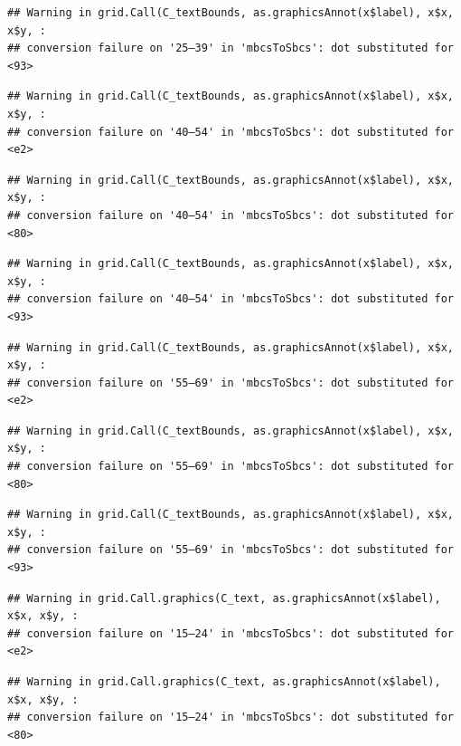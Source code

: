 \documentclass[
]{article}
\begin{document}
\begin{verbatim}
## Warning in grid.Call(C_textBounds, as.graphicsAnnot(x$label), x$x, x$y, :
## conversion failure on '25–39' in 'mbcsToSbcs': dot substituted for <93>
\end{verbatim}

\begin{verbatim}
## Warning in grid.Call(C_textBounds, as.graphicsAnnot(x$label), x$x, x$y, :
## conversion failure on '40–54' in 'mbcsToSbcs': dot substituted for <e2>
\end{verbatim}

\begin{verbatim}
## Warning in grid.Call(C_textBounds, as.graphicsAnnot(x$label), x$x, x$y, :
## conversion failure on '40–54' in 'mbcsToSbcs': dot substituted for <80>
\end{verbatim}

\begin{verbatim}
## Warning in grid.Call(C_textBounds, as.graphicsAnnot(x$label), x$x, x$y, :
## conversion failure on '40–54' in 'mbcsToSbcs': dot substituted for <93>
\end{verbatim}

\begin{verbatim}
## Warning in grid.Call(C_textBounds, as.graphicsAnnot(x$label), x$x, x$y, :
## conversion failure on '55–69' in 'mbcsToSbcs': dot substituted for <e2>
\end{verbatim}

\begin{verbatim}
## Warning in grid.Call(C_textBounds, as.graphicsAnnot(x$label), x$x, x$y, :
## conversion failure on '55–69' in 'mbcsToSbcs': dot substituted for <80>
\end{verbatim}

\begin{verbatim}
## Warning in grid.Call(C_textBounds, as.graphicsAnnot(x$label), x$x, x$y, :
## conversion failure on '55–69' in 'mbcsToSbcs': dot substituted for <93>
\end{verbatim}

\begin{verbatim}
## Warning in grid.Call.graphics(C_text, as.graphicsAnnot(x$label), x$x, x$y, :
## conversion failure on '15–24' in 'mbcsToSbcs': dot substituted for <e2>
\end{verbatim}

\begin{verbatim}
## Warning in grid.Call.graphics(C_text, as.graphicsAnnot(x$label), x$x, x$y, :
## conversion failure on '15–24' in 'mbcsToSbcs': dot substituted for <80>
\end{verbatim}
\end{document}
